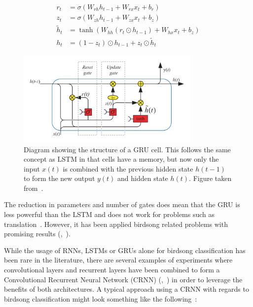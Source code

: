 \begin{align}
  r_t &= \sigma\left( W_{rh}h_{t-1} + W_{rx}x_t + b_r \right) \label{eq:gru_r} \\[0.5em]
  z_t &= \sigma\left( W_{zh}h_{t-1} + W_{zx}x_t + b_z \right) \label{eq:gru_z} \\[0.5em]
  \tilde{h}_t &= \tanh\left( W_{hh}(r_t \odot h_{t-1}) + W_{hx}x_t + b_z \right) \\[0.5em]
  h_t &= (1-z_t) \odot h_{t-1} + z_t \odot \tilde{h}_t
\end{align}

\begin{figure}[ht]
  \centering
  \includegraphics[width=0.8\textwidth]{figures/gru_cell.png}
  \caption{Diagram showing the structure of a GRU cell. This follows the same
    concept as LSTM in that cells have a memory, but now only the input $x(t)$
    is combined with the previous hidden state $h(t-1)$ to form the new output
    $y(t)$ and hidden state $h(t)$. Figure taken
  from~\cite{yu2019review}.}\label{fig:gru_cell}
\end{figure}

The reduction in parameters and number of gates does mean that the GRU is less
powerful than the LSTM and does not work for problems such as
translation~\cite{britz2017massive}. However, it has been applied birdsong
related problems with promising results
(\cite{parrilla2022polyphonic},~\cite{adavanne2017stacked}).

While the usage of RNNs, LSTMs or GRUs alone for birdsong classification has
been rare in the literature, there are several examples of experiments where
convolutional layers and recurrent layers have been combined to form a
Convolutional Recurrent Neural Network (CRNN)
(\cite{yan2021birdsong},~\cite{mukherjee2018convolutional}) in order to leverage
the benefits of both architectures. A typical approach using a CRNN with regards
to birdsong classification might look something like the
following~\cite{crous2019polyphonic}:

